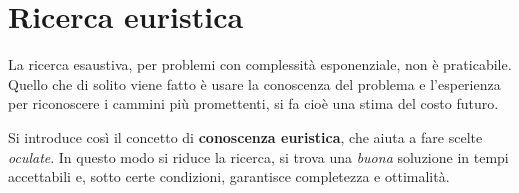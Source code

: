 \chapter{Ricerca euristica}
La ricerca esaustiva, per problemi con complessit\`a esponenziale, non \`e praticabile.
Quello che di solito viene fatto \`e usare la conoscenza del problema e l'esperienza
per riconoscere i cammini pi\`u promettenti, si fa cio\`e una stima del costo futuro.

Si introduce cos\`i il concetto di \textbf{conoscenza euristica}, che aiuta a fare scelte
\emph{oculate}. In questo modo si riduce la ricerca, si trova una \emph{buona} soluzione
in tempi accettabili e, sotto certe condizioni, garantisce completezza e ottimalit\`a.
